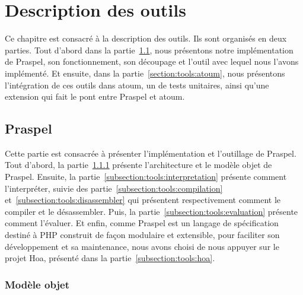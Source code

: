 \chapter{Description des outils}
\label{chapter:tools}

\minitoc

Ce chapitre est consacré à la description des outils. Ils sont organisés en deux
parties. Tout d'abord dans la partie~\ref{section:tools:praspel}, nous
présentons notre implémentation de Praspel, son fonctionnement, son découpage et
l'outil avec lequel nous l'avons implémenté. Et ensuite, dans la
partie~\ref{section:tools:atoum}, nous présentons l'intégration de ces outils
dans atoum, un  de tests unitaires, ainsi qu'une extension
qui fait le pont entre Praspel et atoum.

\section{Praspel}
\label{section:tools:praspel}

Cette partie est consacrée à présenter l'implémentation et l'outillage de
Praspel. Tout d'abord, la partie~\ref{subsection:tools:model} présente
l'architecture et le modèle objet de Praspel. Ensuite, la
partie~\ref{subsection:tools:interpretation} présente comment l'interpréter,
suivie des partie~\ref{subsection:tools:compilation}
et~\ref{subsection:tools:disassembler} qui présentent respectivement comment le
compiler et le désassembler. Puis, la partie~\ref{subsection:tools:evaluation}
présente comment l'évaluer. Et enfin, comme Praspel est un langage de
spécification destiné à PHP construit de façon modulaire et extensible, pour
faciliter son développement et sa maintenance, nous avons choisi de nous appuyer
sur le projet Hoa, présenté dans la partie~\ref{subsection:tools:hoa}.

\subsection{Modèle objet}
\label{subsection:tools:model}

